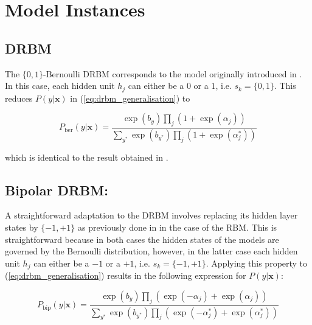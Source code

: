 \documentclass[review]{elsarticle}
\begin{document}
\section{Model Instances}
\subsection{DRBM}
\label{subsubsec:logsig_act}
The $\{0, 1\}$-Bernoulli DRBM corresponds to the model originally
introduced in \cite{Larochelle2008}.  In this case, each hidden unit
$h_j$ can either be a $0$ or a $1$, i.e.  $s_k = \{0, 1\}$.  This
reduces $P(y|\mathbf{x})$ in (\ref{eq:drbm_generalisation}) to

 \begin{equation}
                P_{\textrm{ber}}\left(y|\mathbf{x}\right) 
                =  \frac{\exp\left(b_y\right) \prod_j \left(1 +
                    \exp\left(\alpha_j\right)\right)} {\sum_{y^{*}}
                    \exp\left(b_{y^{*}}\right) \prod_j \left(1 +
                    \exp\left(\alpha^*_j\right)\right)} 
 \end{equation}

 which is identical to the result obtained in \cite{Larochelle2008}.
\subsection{Bipolar DRBM:}
\label{subsubsec:tanh_act}
A straightforward adaptation to the DRBM involves replacing its hidden
layer states by $\{-1, +1\}$ as previously done in \cite{Freund1992}
in the case of the RBM.  This is straightforward because in both cases
the hidden states of the models are governed by the Bernoulli
distribution, however, in the latter case each hidden unit $h_j$ can
either be a $-1$ or a $+1$, i.e. $s_k = \{-1, +1\}$.  Applying this
property to (\ref{eq:drbm_generalisation}) results in the following
expression for $P(y|\mathbf{x})$:

\begin{equation}
 P_{\textrm{bip}}\left(y|\mathbf{x}\right) =
 \frac{\exp\left(b_y\right) \prod_j \left(\exp\left(-\alpha_j\right) +
   \exp\left(\alpha_j\right)\right)} {\sum_{y^{*}}
   \exp\left(b_{y^{*}}\right) \prod_j
   \left(\exp\left(-\alpha^*_j\right) +
   \exp\left(\alpha^*_j\right)\right)}
\end{equation}
\end{document}
